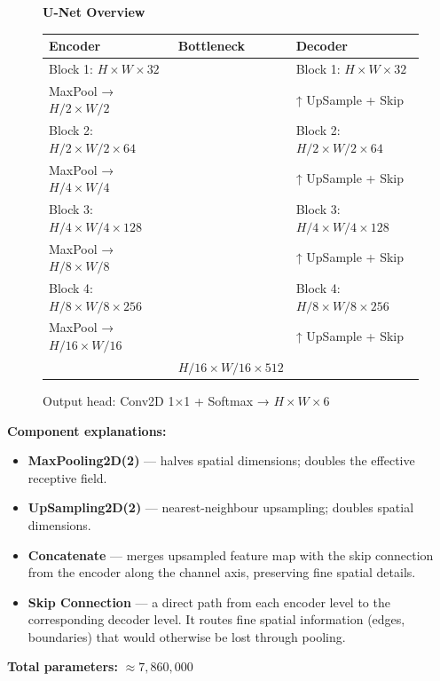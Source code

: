\documentclass[12pt,a4paper]{article}
\begin{document}
\begin{figure}[h!]
  \centering
  \textbf{U-Net Overview}
  \vspace{0.5em}

  \begin{tabular}{lll}
    \textbf{Encoder} & \textbf{Bottleneck} & \textbf{Decoder} \\
    \hline
    Block 1: $H \times W \times 32$   & & Block 1: $H \times W \times 32$ \\
    MaxPool → $H/2 \times W/2$ & & ↑ UpSample + Skip \\
    Block 2: $H/2 \times W/2 \times 64$  & & Block 2: $H/2 \times W/2 \times 64$ \\
    MaxPool → $H/4 \times W/4$ & & ↑ UpSample + Skip \\
    Block 3: $H/4 \times W/4 \times 128$ & & Block 3: $H/4 \times W/4 \times 128$ \\
    MaxPool → $H/8 \times W/8$ & & ↑ UpSample + Skip \\
    Block 4: $H/8 \times W/8 \times 256$ & & Block 4: $H/8 \times W/8 \times 256$ \\
    MaxPool → $H/16 \times W/16$ & & ↑ UpSample + Skip \\
    & $H/16 \times W/16 \times 512$ & \\
  \end{tabular}

  \vspace{0.3em}
  Output head: Conv2D 1×1 + Softmax → $H \times W \times 6$
\end{figure}

\textbf{Component explanations:}
\begin{itemize}[itemsep=3pt]
  \item \textbf{MaxPooling2D(2)} — halves spatial dimensions; doubles the
    effective receptive field.
  \item \textbf{UpSampling2D(2)} — nearest-neighbour upsampling; doubles spatial
    dimensions.
  \item \textbf{Concatenate} — merges upsampled feature map with the skip
    connection from the encoder along the channel axis, preserving fine spatial details.
  \item \textbf{Skip Connection} — a direct path from each encoder level to the
    corresponding decoder level. It routes fine spatial information (edges,
    boundaries) that would otherwise be lost through pooling.
\end{itemize}

\textbf{Total parameters:} $\approx 7{,}860{,}000$
\end{document}
